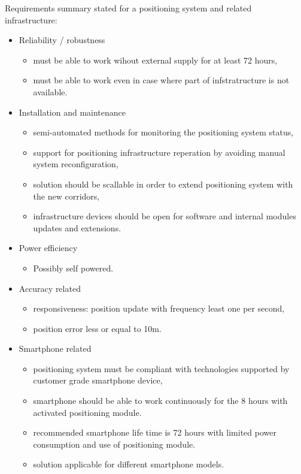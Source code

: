 \documentclass[../main.tex]{subfiles}
\begin{document}
Requirements summary stated for a positioning system and related infrastructure:
\begin{itemize}
	\item Reliability / robustness
	\begin{itemize}
		\item must be able to work wihout external supply for at least 72 hours,
		\item must be able to work even in case where part of infstratructure is not available.
	\end{itemize}
	\item Installation and maintenance
	\begin{itemize}
		\item semi-automated methods for monitoring the positioning system status,
		\item support for positioning infrastructure reperation by avoiding manual system reconfiguration,
		\item solution should be scallable in order to extend positioning system with the new corridors,
		\item infrastructure devices should be open for software and internal modules updates and extensions.
	\end{itemize}
	\item Power efficiency
	\begin{itemize}
		\item Possibly self powered.
	\end{itemize}
	\item Accuracy related
	\begin{itemize}
		\item responsiveness: position update with frequency least one per second,
		\item position error less or equal to 10m.
	\end{itemize}
	\item Smartphone related
	\begin{itemize}
		\item positioning system must be compliant with technologies supported by customer grade smartphone device,
		\item smartphone should be able to work continuously for the 8 hours with activated positioning module.
		\item recommended smartphone life time is 72 hours with limited power consumption and use of positioning module.
		\item solution applicable for different smartphone models.
	\end{itemize}

\end{itemize}
\end{document}
